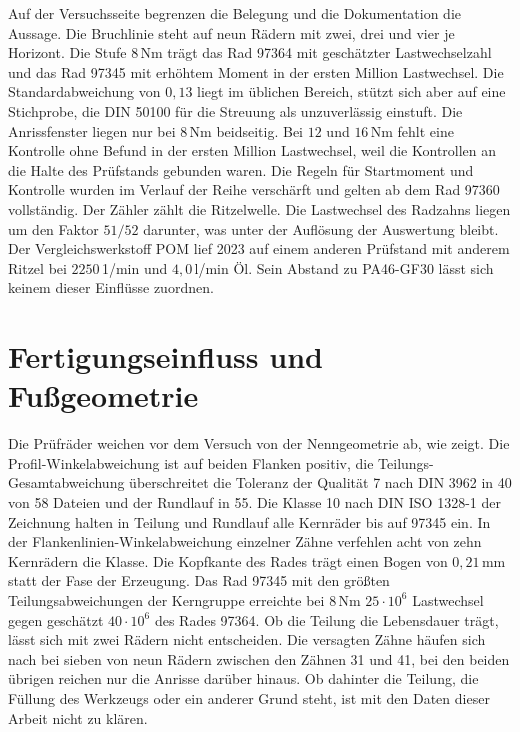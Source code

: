 Auf der Versuchsseite begrenzen die Belegung und die Dokumentation die Aussage. Die Bruchlinie steht auf neun Rädern mit zwei, drei und vier je Horizont. Die Stufe $8$\,Nm trägt das Rad 97364 mit geschätzter Lastwechselzahl und das Rad 97345 mit erhöhtem Moment in der ersten Million Lastwechsel. Die Standardabweichung von $0{,}13$ liegt im üblichen Bereich, stützt sich aber auf eine Stichprobe, die DIN 50100 für die Streuung als unzuverlässig einstuft. Die Anrissfenster liegen nur bei $8$\,Nm beidseitig. Bei $12$ und $16$\,Nm fehlt eine Kontrolle ohne Befund in der ersten Million Lastwechsel, weil die Kontrollen an die Halte des Prüfstands gebunden waren. Die Regeln für Startmoment und Kontrolle wurden im Verlauf der Reihe verschärft und gelten ab dem Rad 97360 vollständig. Der Zähler zählt die Ritzelwelle. Die Lastwechsel des Radzahns liegen um den Faktor $51/52$ darunter, was unter der Auflösung der Auswertung bleibt. Der Vergleichswerkstoff POM lief 2023 auf einem anderen Prüfstand mit anderem Ritzel bei $2250$\,1/min und $4{,}0$\,l/min Öl. Sein Abstand zu PA46-GF30 lässt sich keinem dieser Einflüsse zuordnen.


\section{Fertigungseinfluss und Fußgeometrie}
\label{sec:fertigung_fussgeometrie}

Die Prüfräder weichen vor dem Versuch von der Nenngeometrie ab, wie  zeigt. Die Profil-Winkelabweichung ist auf beiden Flanken positiv, die Teilungs-Gesamtabweichung überschreitet die Toleranz der Qualität 7 nach DIN 3962 in 40 von 58 Dateien und der Rundlauf in 55. Die Klasse 10 nach DIN ISO 1328-1 der Zeichnung halten in Teilung und Rundlauf alle Kernräder bis auf 97345 ein. In der Flankenlinien-Winkelabweichung einzelner Zähne verfehlen acht von zehn Kernrädern die Klasse. Die Kopfkante des Rades trägt einen Bogen von $0{,}21$\,mm statt der Fase der Erzeugung. Das Rad 97345 mit den größten Teilungsabweichungen der Kerngruppe erreichte bei $8$\,Nm $25 \cdot 10^{6}$ Lastwechsel gegen geschätzt $40 \cdot 10^{6}$ des Rades 97364. Ob die Teilung die Lebensdauer trägt, lässt sich mit zwei Rädern nicht entscheiden. Die versagten Zähne häufen sich nach  bei sieben von neun Rädern zwischen den Zähnen 31 und 41, bei den beiden übrigen reichen nur die Anrisse darüber hinaus. Ob dahinter die Teilung, die Füllung des Werkzeugs oder ein anderer Grund steht, ist mit den Daten dieser Arbeit nicht zu klären.


